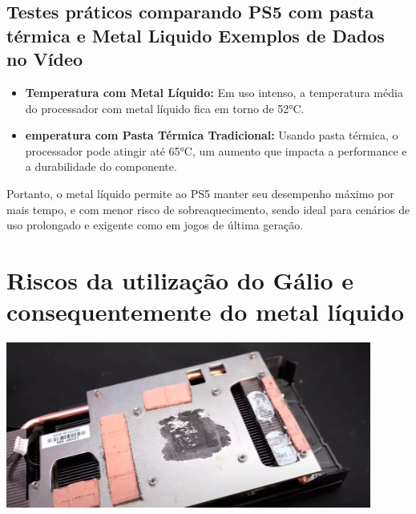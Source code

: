 \documentclass[12pt]{article}
\begin{document}
\subsection{Testes práticos comparando PS5 com pasta térmica e Metal Liquido
Exemplos de Dados no Vídeo}
\begin{itemize}
    \item \textbf{Temperatura com Metal Líquido: } Em uso intenso, a temperatura média do processador com metal líquido fica em torno de 52°C.
    \item \textbf{emperatura com Pasta Térmica Tradicional: } Usando pasta térmica, o processador pode atingir até 65°C, um aumento que impacta a performance e a durabilidade do componente.
\end{itemize}
Portanto, o metal líquido permite ao PS5 manter seu desempenho máximo por mais tempo, e com menor risco de sobreaquecimento, sendo ideal para cenários de uso prolongado e exigente como em jogos de última geração.
\section{Riscos da utilização do Gálio e consequentemente do metal líquido}
\begin{adjustbox}{center,caption={Dissipador de calor que utiliza metal liquido},nofloat=figure,vspace=\bigskipamount}
    \centering
    \includegraphics[width=12cm]{heatspreader.png}
\end{adjustbox}
\end{document}
